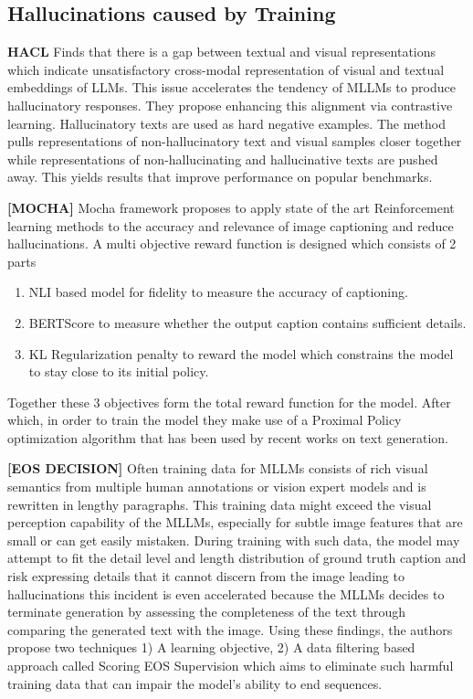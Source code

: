 \documentclass[twocolumn, 9pt]{extarticle}
\begin{document}
\subsection{Hallucinations caused by Training}
\textbf{HACL} 
Finds that there is a gap between textual and visual representations which indicate unsatisfactory cross-modal representation of visual and textual embeddings of LLMs. This issue accelerates the tendency of MLLMs to produce hallucinatory responses. They propose enhancing this alignment via contrastive learning. Hallucinatory texts are used as hard negative examples. The method pulls representations of non-hallucinatory text and visual samples closer together while representations of non-hallucinating and hallucinative texts are pushed away. This yields results that improve performance on popular benchmarks. 


\textbf{[MOCHA]} 
Mocha framework proposes to apply state of the art Reinforcement learning methods to the accuracy and relevance of image captioning and reduce hallucinations. A multi objective reward function is designed which consists of 2 parts 
\begin{enumerate}
    \item NLI based model for fidelity to measure the accuracy of captioning.
    \item BERTScore to measure whether the output caption contains sufficient details.
    \item KL Regularization penalty to reward the model which constrains the model to stay close to its initial policy.
\end{enumerate}
Together these 3 objectives form the total reward function for the model. After which, in order to train the model they make use of a Proximal Policy optimization algorithm that has been used by recent works on text generation.

\textbf{[EOS DECISION]} 
 Often training data for MLLMs consists of rich visual semantics from multiple human annotations or vision expert models and is rewritten in lengthy paragraphs. This training data might exceed the visual perception capability of the MLLMs, especially for subtle image features that are small or can get easily mistaken. During training with such data, the model may attempt to fit the detail level and length distribution of ground truth caption and risk expressing details that it cannot discern from the image leading to hallucinations this incident is even accelerated because the MLLMs decides to terminate generation by assessing the completeness of the text through comparing the generated text with the image. Using these findings, the authors propose two techniques 1) A learning objective, 2) A data filtering based approach called Scoring EOS Supervision which aims to eliminate such harmful training data that can impair the model’s ability to end sequences. 
\end{document}
